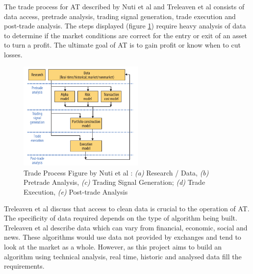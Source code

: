 The trade process for AT described by Nuti et al \cite{ART:Nuti:2011} and Treleaven et al  \cite{ART:Treleaven:2013} consists of data access, pretrade analysis, trading signal generation, trade execution and post-trade analysis. The steps displayed (figure \ref{fig:related:tradeprocess}) require heavy analysis of data to determine if the market conditions are correct for the entry or exit of an asset to turn a profit. The ultimate goal of AT is to gain profit or know when to cut losses. 

\begin{figure}[htb]
    \centering
	\includegraphics[width=0.55\textwidth]{content/graphics/AT-trade_process}
	\caption{Trade Process Figure by Nuti et al \cite{ART:Nuti:2011}: \textit{(a)} Research / Data, \textit{(b)} Pretrade Analysis, \textit{(c)} Trading Signal Generation; \textit{(d)} Trade Execution, \textit{(e)} Post-trade Analysis }
	\label{fig:related:tradeprocess}
\end{figure}

Treleaven et al \cite{ART:Treleaven:2013} discuss that access to clean data is crucial to the operation of AT. The specificity of data required depends on the type of algorithm being built. Treleaven et al describe data which can vary from financial, economic, social and news. These algorithms would use data not provided by exchanges and tend to look at the market as a whole. However, as this project aims to build an algorithm using technical analysis, real time, historic and analysed data fill the requirements.  

